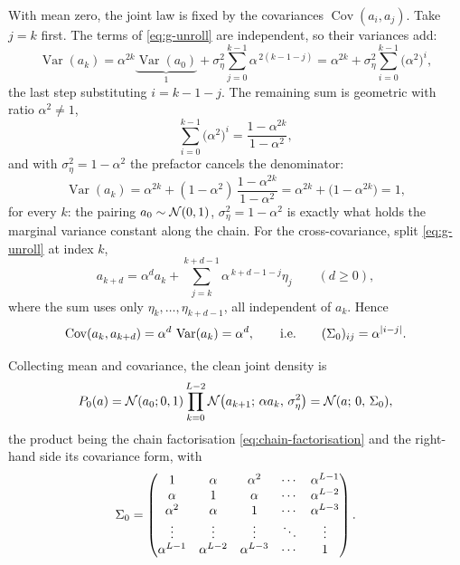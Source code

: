 With mean zero, the joint law is fixed by the covariances
$\operatorname{Cov}(a_i,a_j)$. Take $j = k$ first. The terms of
\eqref{eq:g-unroll} are independent, so their variances add:
\begin{equation}
  \operatorname{Var}(a_k)
  = \alpha^{2k}\underbrace{\operatorname{Var}(a_0)}_{1}
  + \sigma_\eta^2 \sum_{j=0}^{k-1}\alpha^{\,2(k-1-j)}
  = \alpha^{2k}
  + \sigma_\eta^2 \sum_{i=0}^{k-1}\big(\alpha^{2}\big)^{i},
  \label{eq:g-var-sum}
\end{equation}
the last step substituting $i = k-1-j$. The remaining sum is geometric with
ratio $\alpha^2 \neq 1$,
\begin{equation}
  \sum_{i=0}^{k-1}\big(\alpha^{2}\big)^{i}
  = \frac{1 - \alpha^{2k}}{1 - \alpha^{2}},
  \label{eq:g-geom}
\end{equation}
and with $\sigma_\eta^2 = 1-\alpha^2$ the prefactor cancels the denominator:
\begin{equation}
  \operatorname{Var}(a_k)
  = \alpha^{2k} + (1-\alpha^2)\,\frac{1-\alpha^{2k}}{1-\alpha^2}
  = \alpha^{2k} + \big(1 - \alpha^{2k}\big)
  = 1 ,
  \label{eq:g-var-one}
\end{equation}
for every $k$: the pairing $a_0 \sim \mathcal{N}(0,1)$, $\sigma_\eta^2 = 1-\alpha^2$ is
exactly what holds the marginal variance constant along the chain. For the
cross-covariance, split \eqref{eq:g-unroll} at index $k$,
\begin{equation}
  a_{k+d}
  = \alpha^{d} a_k
  + \sum_{j=k}^{k+d-1}\alpha^{\,k+d-1-j}\eta_j
  \qquad (d \ge 0),
  \label{eq:g-split}
\end{equation}
where the sum uses only $\eta_k,\dots,\eta_{k+d-1}$, all independent of $a_k$.
Hence
\begin{equation}
  \operatorname{Cov}(a_k, a_{k+d})
  = \alpha^{d}\,\operatorname{Var}(a_k)
  = \alpha^{d},
  \qquad\text{i.e.}\qquad
  (\Sigma_0)_{ij} = \alpha^{|i-j|}.
  \label{eq:g-cov-lag}
\end{equation}

Collecting mean and covariance, the clean joint density is
\begin{equation}
  P_0(a)
  = \mathcal{N}(a_0; 0, 1)\prod_{k=0}^{L-2}
      \mathcal{N}\big(a_{k+1};\, \alpha a_k,\, \sigma_\eta^2\big)
  = \mathcal{N}(a;\, 0,\, \Sigma_0),
  \label{eq:g-P0}
\end{equation}
the product being the chain factorisation \eqref{eq:chain-factorisation} and
the right-hand side its covariance form, with
\begin{equation}
  \Sigma_0
  =
  \begin{pmatrix}
    1 & \alpha & \alpha^2 & \cdots & \alpha^{L-1} \\
    \alpha & 1 & \alpha & \cdots & \alpha^{L-2} \\
    \alpha^2 & \alpha & 1 & \cdots & \alpha^{L-3} \\
    \vdots & \vdots & \vdots & \ddots & \vdots \\
    \alpha^{L-1} & \alpha^{L-2} & \alpha^{L-3} & \cdots & 1
  \end{pmatrix}.
  \label{eq:g-Sig0-matrix}
\end{equation}

